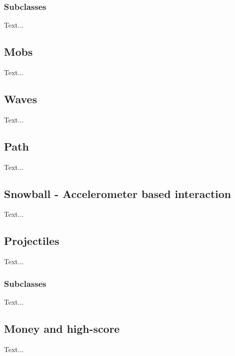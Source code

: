 \subsubsection{Subclasses}
Text...
\subsection{Mobs}
Text...
\subsection{Waves}
Text...
\subsection{Path}
Text...
\subsection{Snowball - Accelerometer based interaction}
Text...
\subsection{Projectiles}
Text...

\subsubsection{Subclasses}

Text...
\subsection{Money and high-score}

Text...